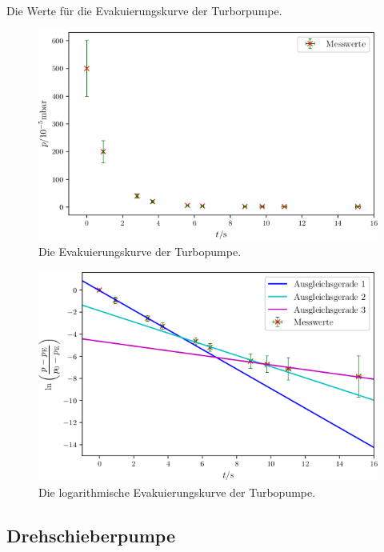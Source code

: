 \begin{table}
\centering
\caption{Die Werte für die Evakuierungskurve der Turborpumpe.}

\label{tab:TS}
\end{table}

\begin{figure}
\centering
\includegraphics[width=\linewidth-70pt,height=\textheight-70pt,keepaspectratio]{content/images/TSE.png}
\caption{Die Evakuierungskurve der Turbopumpe.}
\label{fig:TSE}
\end{figure}

\begin{figure}
\centering
\includegraphics[width=\linewidth-70pt,height=\textheight-70pt,keepaspectratio]{content/images/TSL.png}
\caption{Die logarithmische Evakuierungskurve der Turbopumpe.}
\label{fig:TSL}
\end{figure}

\subsection{Drehschieberpumpe}

